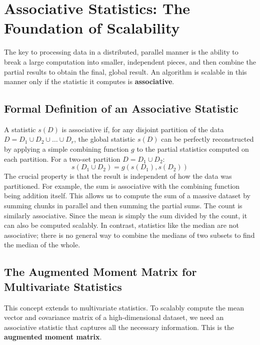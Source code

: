 \section{Associative Statistics: The Foundation of Scalability}
\label{sec:associative_statistics}
The key to processing data in a distributed, parallel manner is the ability to break a large computation into smaller, independent pieces, and then combine the partial results to obtain the final, global result. An algorithm is scalable in this manner only if the statistic it computes is \textbf{associative}.

\subsection*{Formal Definition of an Associative Statistic}
A statistic $s(D)$ is associative if, for any disjoint partition of the data $D = D_1 \cup D_2 \cup \dots \cup D_r$, the global statistic $s(D)$ can be perfectly reconstructed by applying a simple combining function $g$ to the partial statistics computed on each partition. For a two-set partition $D = D_1 \cup D_2$:
$$ s(D_1 \cup D_2) = g(s(D_1), s(D_2)) $$
The crucial property is that the result is independent of how the data was partitioned. For example, the sum is associative with the combining function being addition itself. This allows us to compute the sum of a massive dataset by summing chunks in parallel and then summing the partial sums. The count is similarly associative. Since the mean is simply the sum divided by the count, it can also be computed scalably. In contrast, statistics like the median are not associative; there is no general way to combine the medians of two subsets to find the median of the whole.

\subsection*{The Augmented Moment Matrix for Multivariate Statistics}
This concept extends to multivariate statistics. To scalably compute the mean vector and covariance matrix of a high-dimensional dataset, we need an associative statistic that captures all the necessary information. This is the \textbf{augmented moment matrix}.

